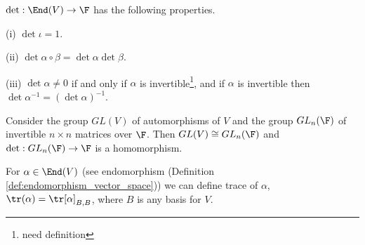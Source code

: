 \begin{theorem}
$\det : \End(V) \to \F$ has the following properties.
\ben
\item [(i)] $\det \iota = 1$.
\item [(ii)] $\det \alpha \circ \beta = \det \alpha \det \beta$.
\item [(iii)] $\det \alpha \neq 0$ if and only if $\alpha$ is invertible\footnote{need definition}, and if $\alpha$ is invertible then $\det \alpha^{-1} = (\det \alpha)^{-1}$.
\een
\end{theorem}

\begin{remark}
Consider the group $GL(V)$ of automorphisms of $V$ and the group $GL_n(\F)$ of invertible $n \times n$ matrices over $\F$. Then $GL(V ) \cong GL_n(\F)$ and $\det : GL_n(\F) \to \F$ is a homomorphism.
\end{remark}

\begin{definition}\label{def:trace_linear_endomorphism}
For $\alpha \in \End(V)$ (see endomorphism (Definition \ref{def:endomorphism_vector_space})) we can define trace of $\alpha$, $\tr(\alpha) = \tr[\alpha]_{B,B}$, where $B$ is any basis for $V$.
\end{definition}

